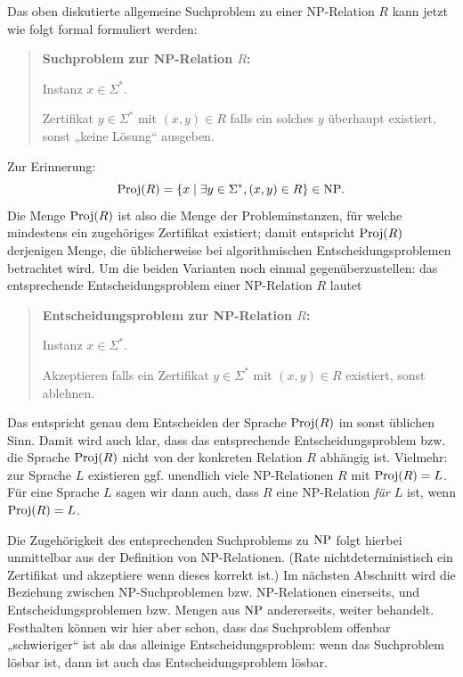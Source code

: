 Das oben diskutierte allgemeine Suchproblem zu einer NP-Relation $R$ kann jetzt wie folgt formal formuliert werden:
\begin{quote}
    \textbf{Suchproblem zur NP-Relation $R$:}
    \begin{description}[nosep]
        \item[Gegeben:] Instanz $x\in\Sigma^*$.
        \item[Gesucht:] Zertifikat $y\in\Sigma^*$ mit $(x,y)\in  R$ falls ein solches $y$ überhaupt existiert, sonst „keine Lösung“ ausgeben.
    \end{description}
\end{quote}
Zur Erinnerung:
\[ \operatorname{Proj}(R) = \{ x \mid \exists y\in\Sigma^*, (x,y)\in R \}\in\mathrm{NP}. \]
Die Menge $\operatorname{Proj}(R)$ ist also die Menge der Probleminstanzen, für welche mindestens ein zugehöriges Zertifikat existiert; damit entspricht $\operatorname{Proj}(R)$ derjenigen Menge, die üblicherweise bei algorithmischen Entscheidungsproblemen betrachtet wird. 
Um die beiden Varianten noch einmal gegenüberzustellen: das entsprechende Entscheidungsproblem einer NP-Relation $R$ lautet
\begin{quote}
    \textbf{Entscheidungsproblem zur NP-Relation $R$:}
    \begin{description}[nosep]
        \item[Gegeben:] Instanz $x\in\Sigma^*$.
        \item[Gesucht:] Akzeptieren falls ein Zertifikat $y\in\Sigma^*$ mit $(x,y)\in  R$ existiert, sonst ablehnen.
    \end{description}
\end{quote}
Das entspricht genau dem Entscheiden der Sprache $\operatorname{Proj}(R)$ im sonst üblichen Sinn. Damit wird auch klar, dass das entsprechende Entscheidungsproblem bzw. die Sprache $\operatorname{Proj}(R)$ nicht von der konkreten Relation $R$ abhängig ist. Vielmehr: zur Sprache $L$ existieren ggf. unendlich viele NP-Relationen $R$ mit $\operatorname{Proj}(R)=L$.  Für eine Sprache $L$ sagen wir dann auch, dass $R$ eine NP-Relation \emph{für $L$} ist, wenn $\operatorname{Proj}(R)=L$.

Die Zugehörigkeit des entsprechenden Suchproblems zu $\mathrm{NP}$ folgt hierbei unmittelbar aus der Definition von NP-Relationen. (Rate nichtdeterministisch ein Zertifikat und akzeptiere wenn dieses korrekt ist.)
Im nächsten Abschnitt wird die Beziehung zwischen NP-Suchproblemen bzw. NP-Relationen einerseits, und Entscheidungsproblemen bzw. Mengen aus $\mathrm{NP}$ andererseits, weiter behandelt.
Festhalten können wir hier aber schon, dass das Suchproblem offenbar „schwieriger“ ist als das alleinige Entscheidungsproblem: wenn das Suchproblem lösbar ist, dann ist auch das Entscheidungsproblem lösbar.

